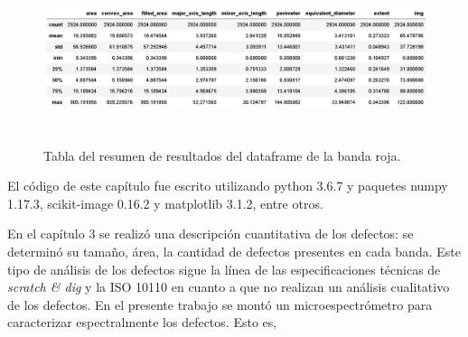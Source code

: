 \begin{figure}[H]
	\centering
	\includegraphics[width=1.0\textwidth,height= 5.0cm]{Figs/resultados_defectos/tabla_roja.png}
	\caption{Tabla del resumen de resultados del dataframe de la banda roja.}
	\label{fig:bgcel}
\end{figure}






El código de este capítulo fue escrito utilizando python 3.6.7 y paquetes numpy 1.17.3, scikit-image 0.16.2 y matplotlib 3.1.2, entre otros.

En el capítulo 3 se realizó una descripción cuantitativa de los defectos: se determinó su tamaño, área, la cantidad de defectos presentes en cada banda. Este tipo de análisis de los defectos sigue la línea de las especificaciones técnicas de \textit{scratch \& dig} y la ISO 10110 en cuanto a que no realizan un análisis cualitativo de los defectos. En el presente trabajo se montó un microespectrómetro para caracterizar espectralmente los defectos. Esto es,

\vspace{1cm}
\vspace{1cm}

 \vspace{1cm}
\vspace{1cm}

\vspace{1cm}
\vspace{1cm}

\vspace{1.0cm}
\vspace{1.0cm}

